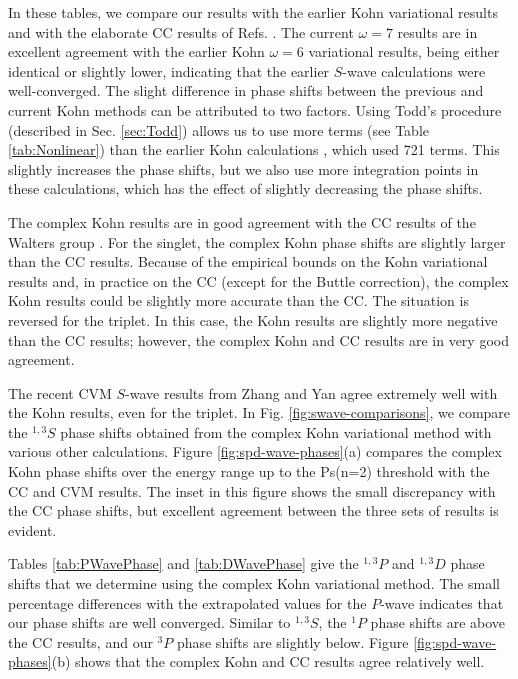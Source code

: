 \documentclass[preprint,showpacs,showkeys,preprintnumbers,amsmath,amssymb,longbibliography,pra,aps]{revtex4-1}
\begin{document}
In these tables, we compare our results with the earlier Kohn variational 
results \cite{VanReeth2003,VanReeth2004} and with the elaborate CC results of 
Refs. \cite{Blackwood2002,Walters2004}. The current $\omega = 7$ results are 
in excellent agreement with the earlier Kohn $\omega = 6$ variational 
results, being either identical or slightly lower, indicating that the 
earlier $S$-wave calculations were well-converged. The slight difference in 
phase shifts between the previous and current Kohn methods can be attributed 
to two factors. Using Todd's procedure (described in Sec. \ref{sec:Todd}) 
allows us to use more terms (see Table \ref{tab:Nonlinear}) than the earlier 
Kohn calculations \cite{VanReeth2003,VanReeth2004}, which used 721 terms. 
This slightly increases the phase shifts, but we also use more integration 
points in these calculations, which has the effect of slightly decreasing the 
phase shifts.

The complex Kohn results are in good agreement with the CC results of the 
Walters group \cite{Blackwood2002,Walters2004}. For the singlet, the complex 
Kohn phase shifts are slightly larger than the CC results. Because of the 
empirical bounds on the Kohn variational results and, in practice on the CC
(except for the Buttle correction), the complex Kohn results could be slightly 
more accurate than the CC.
The situation is reversed for the triplet. In this case, the Kohn results are 
slightly more negative than the CC results; however, the complex Kohn and CC 
results are in very good agreement.

The recent CVM $S$-wave results from Zhang and Yan \cite{Zhang2012} agree 
extremely well with the Kohn results, even for the triplet. In Fig.
\ref{fig:swave-comparisons},
we compare the $^{1,3}S$ phase shifts obtained from 
the complex Kohn variational method with various other calculations. Figure 
\ref{fig:spd-wave-phases}(a) compares the complex Kohn phase shifts over the 
energy range up to the Ps(n=2) threshold with the CC and CVM results. The 
inset in this figure shows the small discrepancy with the CC phase shifts, 
but excellent agreement between the three sets of results is evident. 

Tables \ref{tab:PWavePhase} and \ref{tab:DWavePhase} give the $^{1,3}P$ and
$^{1,3}D$
 phase shifts that we determine using the complex Kohn variational 
method. The small percentage differences with the extrapolated values for the 
$P$-wave indicates that our phase shifts are well converged. Similar to $^{1,3}S$,
the $^1P$ phase shifts are above the CC results, and our $^3P$ phase 
shifts are slightly below. Figure \ref{fig:spd-wave-phases}(b) shows that the 
complex Kohn and CC results agree relatively well.
\end{document}
